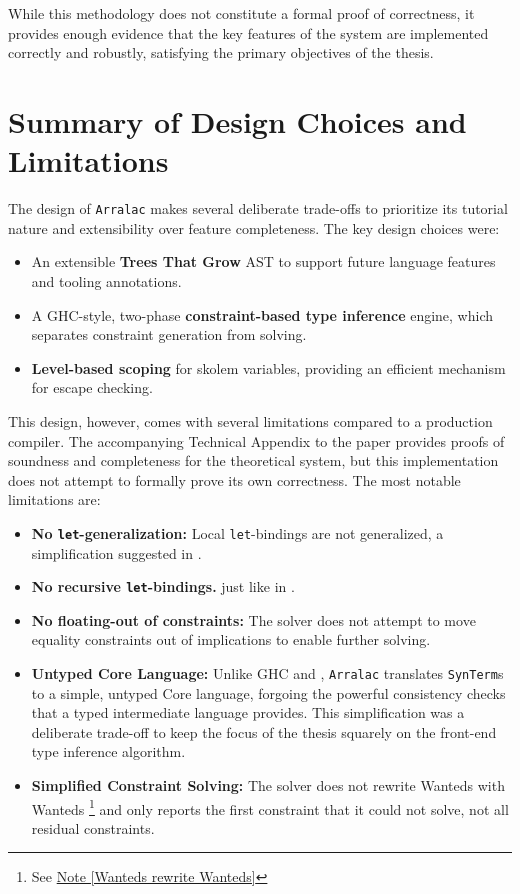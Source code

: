 While this methodology does not constitute a formal proof of correctness, it provides enough evidence that the key features of the system are implemented correctly and robustly, satisfying the primary objectives of the thesis.

\section{Summary of Design Choices and Limitations}
\label{sec:Design:Summary}

The design of \texttt{Arralac} makes several deliberate trade-offs to prioritize its tutorial nature and extensibility over feature completeness. The key design choices were:
\begin{itemize}
    \item An extensible \textbf{Trees That Grow} AST to support future language features and tooling annotations.
    \item A GHC-style, two-phase \textbf{constraint-based type inference} engine, which separates constraint generation from solving.
    \item \textbf{Level-based scoping} for skolem variables, providing an efficient mechanism for escape checking.
\end{itemize}

This design, however, comes with several limitations compared to a production compiler. The accompanying Technical Appendix to the paper \cite{practical-type-inference-proofs} provides proofs of soundness and completeness for the theoretical system, but this implementation does not attempt to formally prove its own correctness. The most notable limitations are:
\begin{itemize}
    \item \textbf{No \texttt{let}-generalization:} Local \texttt{let}-bindings are not generalized, a simplification suggested in \cite{vytiniotis-outsideinx-2011}.
    \item \textbf{No recursive \texttt{let}-bindings.} just like in \cite{jones-practical-2007}.
    \item \textbf{No floating-out of constraints:} The solver does not attempt to move equality constraints out of implications to enable further solving.
    \item \textbf{Untyped Core Language:} Unlike GHC and \cite{jones-practical-2007}, \texttt{Arralac} translates \texttt{SynTerm}s to a simple, untyped Core language, forgoing the powerful consistency checks that a typed intermediate language provides. This simplification was a deliberate trade-off to keep the focus of the thesis squarely on the front-end type inference algorithm.
    \item \textbf{Simplified Constraint Solving:} The solver does not rewrite Wanteds with Wanteds \footnote{See \href{https://github.com/ghc/ghc/blob/ed38c09bd89307a7d3f219e1965a0d9743d0ca73/compiler/GHC/Tc/Types/Constraint.hs\#L2415}{Note [Wanteds rewrite Wanteds]}} and only reports the first constraint that it could not solve, not all residual constraints.
\end{itemize}